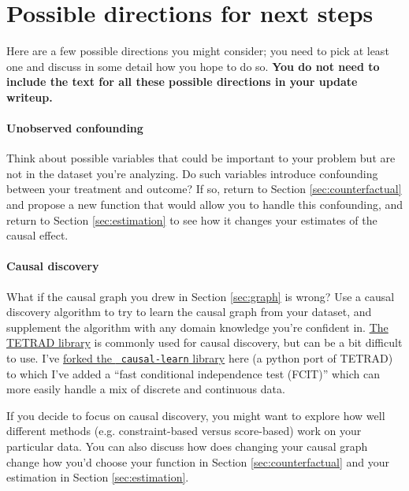 \documentclass[12pt]{article}
\begin{document}
\appendix

\section{Possible directions for next steps} \label{app:next_steps}

Here are a few possible directions you might consider; you need to pick at
least one and discuss in some detail how you hope to do so. {\bf You do not need
to include the text for all these possible directions in your update writeup.}

\paragraph{Unobserved confounding}

Think about possible variables that could be important to your problem but
are not in the dataset you're analyzing. Do such variables introduce confounding
between your treatment and outcome? If so, return to Section
\ref{sec:counterfactual} and propose a new function that would allow you to
handle this confounding, and return to Section \ref{sec:estimation} to see
how it changes your estimates of the causal effect.

\paragraph{Causal discovery}

What if the causal graph you drew in Section \ref{sec:graph} is wrong? Use
a causal discovery algorithm to try to learn the causal graph from your
dataset, and supplement the algorithm with any domain knowledge you're confident in.
\href{https://rawgit.com/cmu-phil/tetrad/development/tetrad-gui/src/main/resources/resources/javahelp/manual/tetrad_tutorial.html}{The
TETRAD library} is commonly used for causal discovery, but can be a bit
difficult to use. I've
\href{https://github.com/zachwooddoughty/causal-learn}{forked the {\tt
causal-learn} library} here (a python port of TETRAD) to which I've added a
``fast conditional independence test (FCIT)'' which can more easily handle a
mix of discrete and continuous data.

If you decide to focus on causal discovery, you might want to explore how well
different methods (e.g. constraint-based versus score-based) work on your
particular data. You can also discuss how does changing your causal graph
change how you'd choose your function in Section \ref{sec:counterfactual} and
your estimation in Section \ref{sec:estimation}.
\end{document}
